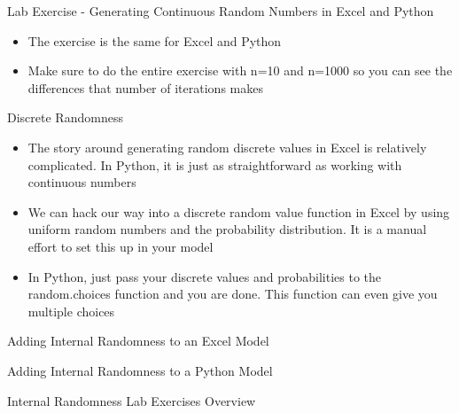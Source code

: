 \documentclass[]{article}
\begin{document}
\begin{section}{Lab Exercise - Generating Continuous Random Numbers in Excel and Python}
\begin{itemize}
\item The exercise is the same for Excel and Python
\item Make sure to do the entire exercise with n=10 and n=1000 so you can see the differences that number of iterations makes
\end{itemize}
\end{section}
\begin{section}{Discrete Randomness}
\begin{itemize}
\item The story around generating random discrete values in Excel is relatively complicated. In Python, it is just as straightforward as working with continuous numbers
\item We can hack our way into a discrete random value function in Excel by using uniform random numbers and the probability distribution. It is a manual effort to set this up in your model
\item In Python, just pass your discrete values and probabilities to the random.choices function and you are done. This function can even give you multiple choices
\end{itemize}
\end{section}
\begin{section}{Adding Internal Randomness to an Excel Model}

\end{section}
\begin{section}{Adding Internal Randomness to a Python Model}

\end{section}
\begin{section}{Internal Randomness Lab Exercises Overview}

\end{section}
\end{document}

